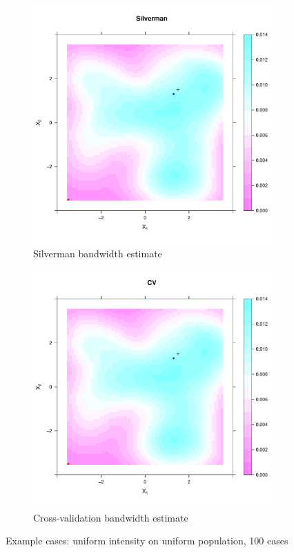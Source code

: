 \begin{figure}[htbp]
    \begin{subfigure}[b]{0.45\textwidth}
    \includegraphics[width=\textwidth]{results/unif_100_unif/output/silverman_intensity_heatmap}
    \caption{Silverman bandwidth estimate}
    \end{subfigure}%
    \begin{subfigure}[b]{0.45\textwidth}
    \includegraphics[width=\textwidth]{results/unif_100_unif/output/CV_intensity_heatmap}
    \caption{Cross-validation bandwidth estimate}
    \end{subfigure}
    \caption{Example cases: uniform intensity on uniform population, 100 cases}
    \label{fig:cases:unif_100_unif}
\end{figure}


